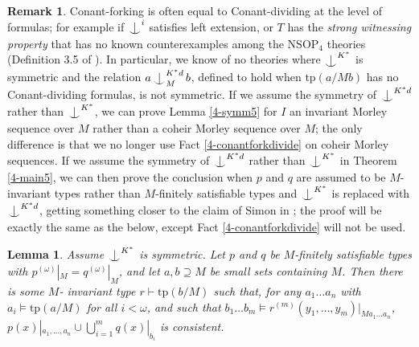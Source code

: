 \documentclass[12pt]{amsart}
\newtheorem{lemma}[theorem]{Lemma}
\theoremstyle{definition}
\newtheorem{remark}[theorem]{Remark}
\def\Ind#1#2{#1\setbox0=\hbox{$#1x$}\kern\wd0\hbox to 0pt{\hss$#1\mid$\hss}
\lower.9\ht0\hbox to 0pt{\hss$#1\smile$\hss}\kern\wd0}
\def\ind{\mathop{\mathpalette\Ind{}}}
\begin{document}
\begin{remark} \label{4-conantdiv}
Conant-forking is often equal to Conant-dividing at the level of formulas; for example if $\ind^{i}$ satisfies left extension, or $T$ has the \textit{strong witnessing property} that has no known counterexamples among the $\mathrm{NSOP}_{4}$ theories (Definition 3.5 of \cite{GFA}). In particular, we know of no theories where $\ind^{K^{*}}$ is symmetric and the relation $a \ind^{K^{*}d}_{M} b$, defined to hold when $\mathrm{tp}(a/Mb)$ has no Conant-dividing formulas, is not symmetric. If we assume the symmetry of $\ind^{K^{*}d}$ rather than $\ind^{K^{*}}$, we can prove Lemma \ref{4-symm5} for $I$ an invariant Morley sequence over $M$ rather than a coheir Morley sequence over $M$; the only difference is that we no longer use Fact \ref{4-conantforkdivide} on coheir Morley sequences. If we assume the symmetry of $\ind^{K^{*}d}$ rather than $\ind^{K^{*}}$ in Theorem \ref{4-main5}, we can then prove the conclusion when $p$ and $q$ are assumed to be $M$-invariant types rather than $M$-finitely satisfiable types and $\ind^{K^{*}}$ is replaced with $\ind^{K^{*}d}$, getting something closer to the claim of Simon in \cite{Sim20}; the proof will be exactly the same as the below, except Fact \ref{4-conantforkdivide} will not be used.

\end{remark}


\begin{lemma}\label{4-consistency5}
Assume $\ind^{K^{*}}$ is symmetric. Let $p$ and $q$ be $M$-finitely satisfiable types with $p^{(\omega)}|_{M} = q^{(\omega)}|_{M}$, and let $a, b \supseteq M$ be small sets containing $M$. Then there is some $M$- invariant type $r \vdash \mathrm{tp}(b/M)$ such that, for any $a_{1} \ldots a_{n}$ with $a_{i} \models \mathrm{tp}(a/M)$ for all $i < \omega$, and such that $b_{1} \ldots b_{m} \models r^{(m)}(y_{1}, \ldots, y_{m})|_{Ma_{1}\ldots a_{n}}$, $p(x)|_{a_1, \ldots, a_n}\cup \bigcup_{i=1}^{m} q(x)|_{b_{i}}$ is consistent.

\end{lemma}
\end{document}

